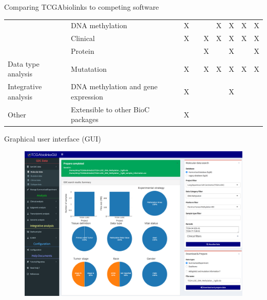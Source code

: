 \documentclass[slidestop,compress,11pt,xcolor=dvipsnames]{beamer}
\begin{document}
\begin{frame}{Comparing TCGAbiolinks to competing software}
\begin{table}
\begin{tabular}{p{3cm}p{3cm}|l|l|l|l|c|l|c|}
\multicolumn{1}{|l|}{} & DNA methylation & X &  &  & X & X & X & X \\ \cline{2-9}
\multicolumn{1}{|l|}{} & Clinical & X &  & X & X & X & X & X \\ \cline{2-9}
\multicolumn{1}{|l|}{} & Protein &  &  & X &  & X &  & X \\ \cline{2-9}
\multicolumn{1}{|l|}{\multirow{-7}{*}{Data type analysis}} & Mutatation & X &  & X & X & X & X & X \\ \hline
\multicolumn{1}{|l|}{Integrative analysis} & DNA methylation and gene expression & X &  &  &  & X &  &  \\ \hline
\multicolumn{1}{|l|}{Other} & Extensible to other BioC packages & X &  &  &  &  &  &  \\ \hline
\end{tabular}
\end{table}
\end{frame}


\begin{frame}{Graphical user interface (GUI)}
 \vspace*{-0.5cm}
 \begin{figure}
  \centering
  \includegraphics[width=1.0\linewidth]{TCGAbiolinks/GUI.png}
 \end{figure}
\end{frame}
\end{document}
